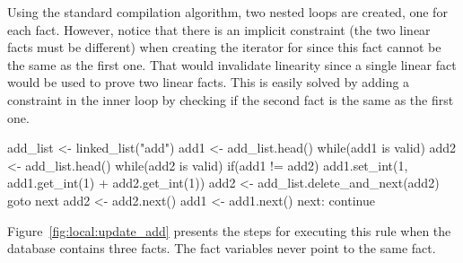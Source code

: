 Using the standard compilation algorithm, two nested loops are created, one for
each  fact. However, notice that there is an implicit constraint (the
two  linear facts must be different) when creating the iterator for
 since this fact cannot be the same as the first one. That
would invalidate linearity since a single linear fact would be used to prove two
linear facts. This is easily solved by adding a constraint in the inner loop by
checking if the second fact is the same as the first one.

\begin{LineCode}
add_list <- linked_list("add")
add1 <- add_list.head()
while(add1 is valid)
{
   add2 <- add_list.head()
   while(add2 is valid)
   {
      if(add1 != add2)
      {
         add1.set_int(1, add1.get_int(1) + add2.get_int(1))
         add2 <- add_list.delete_and_next(add2)
         goto next
      }
      add2 <- add2.next()
   }
   add1 <- add1.next()
next:
   continue
}
\end{LineCode}

Figure~\ref{fig:local:update_add} presents the steps for executing this rule
when the database contains three facts. The fact variables never point to the
same fact.

